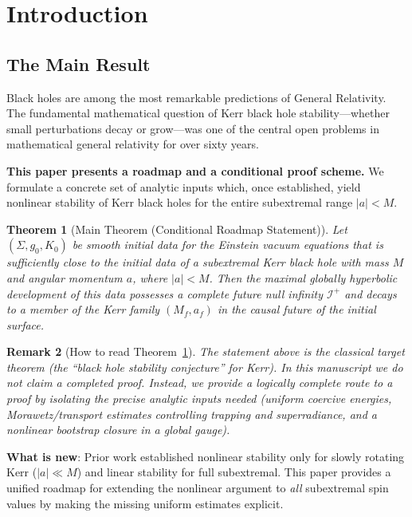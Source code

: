 \documentclass[12pt,a4paper]{article}
\newtheorem{theorem}{Theorem}[section]
\newtheorem{remark}[theorem]{Remark}
\newcommand{\Scri}{\mathcal{I}^+}
\begin{document}
\section{Introduction}

\subsection{The Main Result}

Black holes are among the most remarkable predictions of General Relativity. The fundamental mathematical question of Kerr black hole stability---whether small perturbations decay or grow---was one of the central open problems in mathematical general relativity for over sixty years.


\textbf{This paper presents a roadmap and a conditional proof scheme.} We formulate a concrete set of analytic inputs which, once established, yield nonlinear stability of Kerr black holes for the entire subextremal range $|a| < M$.

\begin{theorem}[Main Theorem (Conditional Roadmap Statement)]\label{thm:main-conditional}
Let $(\Sigma, g_0, K_0)$ be smooth initial data for the Einstein vacuum equations that is sufficiently close to the initial data of a subextremal Kerr black hole with mass $M$ and angular momentum $a$, where $|a| < M$. Then the maximal globally hyperbolic development of this data possesses a complete future null infinity $\Scri$ and decays to a member of the Kerr family $(M_f, a_f)$ in the causal future of the initial surface.
\end{theorem}

\begin{remark}[How to read Theorem~\ref{thm:main-conditional}]
The statement above is the classical target theorem (the ``black hole stability conjecture'' for Kerr). In this manuscript we do \emph{not} claim a completed proof. Instead, we provide a logically complete route to a proof by isolating the precise analytic inputs needed (uniform coercive energies, Morawetz/transport estimates controlling trapping and superradiance, and a nonlinear bootstrap closure in a global gauge).
\end{remark}


\textbf{What is new}: Prior work established nonlinear stability only for slowly rotating Kerr ($|a| \ll M$) and linear stability for full subextremal. This paper provides a unified roadmap for extending the nonlinear argument to \textit{all} subextremal spin values by making the missing uniform estimates explicit.
\end{document}
